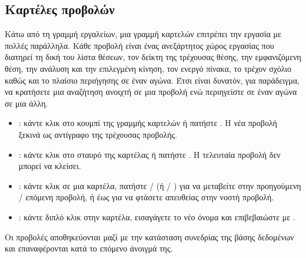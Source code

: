 \documentclass[letterpaper,10pt,greek]{sphinxmanual}
\begin{document}
\subsection{Καρτέλες προβολών}
\label{\detokenize{manuel:onglets-de-vues}}\label{\detokenize{manuel:onglets-vues}}
\sphinxAtStartPar
Κάτω από τη γραμμή εργαλείων, μια γραμμή καρτελών επιτρέπει την εργασία με πολλές  παράλληλα. Κάθε προβολή είναι ένας ανεξάρτητος χώρος εργασίας που διατηρεί τη δική του λίστα θέσεων, τον δείκτη της τρέχουσας θέσης, την εμφανιζόμενη θέση, την ανάλυση και την επιλεγμένη κίνηση, τον ενεργό πίνακα, το τρέχον σχόλιο καθώς και το πλαίσιο περιήγησης σε έναν αγώνα. Έτσι είναι δυνατόν, για παράδειγμα, να κρατήσετε μια αναζήτηση ανοιχτή σε μια προβολή ενώ περιηγείστε σε έναν αγώνα σε μια άλλη.
\begin{itemize}
\item {} 
\sphinxAtStartPar
{}: κάντε κλικ στο κουμπί \sphinxstyleemphasis{+} της γραμμής καρτελών ή πατήστε . Η νέα προβολή ξεκινά ως αντίγραφο της τρέχουσας προβολής.

\item {} 
\sphinxAtStartPar
{}: κάντε κλικ στο σταυρό της καρτέλας ή πατήστε . Η τελευταία προβολή δεν μπορεί να κλείσει.

\item {} 
\sphinxAtStartPar
{}: κάντε κλικ σε μια καρτέλα, πατήστε  /  (ή  / ) για να μεταβείτε στην προηγούμενη / επόμενη προβολή, ή  έως  για να φτάσετε απευθείας στην ν\sphinxhyphen{}οστή προβολή.

\item {} 
\sphinxAtStartPar
{}: κάντε διπλό κλικ στην καρτέλα, εισαγάγετε το νέο όνομα και επιβεβαιώστε με .

\end{itemize}

\sphinxAtStartPar
Οι προβολές αποθηκεύονται μαζί με την κατάσταση συνεδρίας της βάσης δεδομένων και επαναφέρονται κατά το επόμενο άνοιγμά της.
\end{document}
